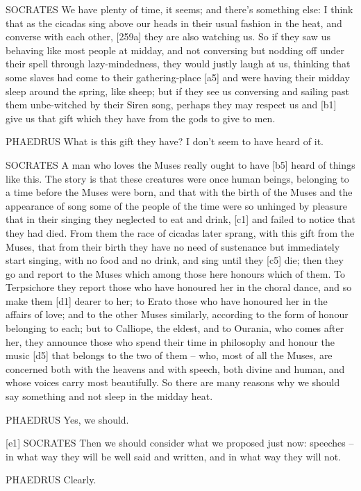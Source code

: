 SOCRATES We have plenty of time, it seems; and there's something else: I
think that as the cicadas sing above our heads in their usual fashion in
the heat, and converse
with each other,
{[}259a{]} they are also watching us. So if they saw us behaving like
most people at midday, and not conversing but nodding off under their
spell through lazy-mindedness, they would justly laugh at us, thinking
that some slaves had come to their gathering-place {[}a5{]} and were
having their midday sleep around the spring, like sheep; but if they see
us conversing and sailing past them unbe-witched by their Siren song,
perhaps they may respect us and {[}b1{]} give us that gift which they
have from the gods to give to men.

PHAEDRUS What is this gift they have? I don't seem to have heard of it.

SOCRATES A man who loves the Muses really ought to have {[}b5{]} heard
of things like this. The story is that these creatures were once human
beings, belonging to a time before the Muses were born, and that with
the birth of the Muses and the appearance of song some of the people of
the time were so unhinged by pleasure that in their singing they
neglected to eat and drink, {[}c1{]} and failed to notice that they had
died. From them the race of cicadas later sprang, with this gift from
the Muses, that from their birth they have no need of sustenance but
immediately start singing, with no food and no drink, and sing until
they {[}c5{]} die; then they go and report to the Muses which among
those here honours which of them. To Terpsichore they report those who
have honoured her in the choral dance, and so make them {[}d1{]} dearer
to her; to Erato those who have honoured her in the affairs of love; and
to the other Muses similarly, according to the form of honour belonging
to each; but to Calliope, the eldest, and to Ourania, who comes after
her, they announce those who spend their time in philosophy and honour
the music {[}d5{]} that belongs to the two of them -- who, most of all
the Muses, are concerned both with the heavens and with
speech, both divine and
human, and whose voices carry most beautifully. So there are many
reasons why we should say something and not sleep in the midday heat.

PHAEDRUS Yes, we should.

{[}e1{]} SOCRATES Then we should consider what we proposed just now:
speeches -- in what way they will be well said and written, and in what
way they will not.

PHAEDRUS Clearly.

